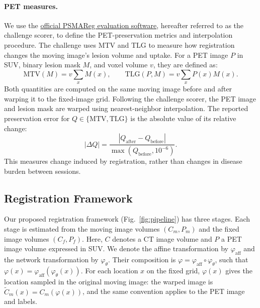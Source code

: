 \paragraph{PET measures.}
We use the \href{https://github.com/JHU-MedImage-Reg/Learn2Reg26_PSMA/tree/main/psmareg_scoring_program}{official PSMAReg evaluation software}, hereafter referred to as the challenge scorer, to define the PET-preservation metrics and interpolation procedure.
The challenge uses MTV and TLG to measure how registration changes the moving image's lesion volume and uptake.
For a PET image $P$ in SUV, binary lesion mask $M$, and voxel volume $v$, they are defined as:
\begin{equation}
  \mathrm{MTV}(M) = v\sum_x M(x), \qquad
  \mathrm{TLG}(P,M) = v\sum_x P(x)M(x).
  \label{eq:pet_measures}
\end{equation}
Both quantities are computed on the same moving image before and after warping it to the fixed-image grid.
Following the challenge scorer, the PET image and lesion mask are warped using nearest-neighbor interpolation.
The reported preservation error for $Q\in\{\mathrm{MTV},\mathrm{TLG}\}$ is the absolute value of its relative change:
\begin{equation}
  |\Delta Q| = \frac{|Q_{\mathrm{after}} - Q_{\mathrm{before}}|}{\max(Q_{\mathrm{before}},10^{-6})}.
  \label{eq:pet_error}
\end{equation}
This measures change induced by registration, rather than changes in disease burden between sessions.

\subsection{Registration Framework}
\label{sect:pipeline}

Our proposed registration framework (Fig.~\ref{fig:pipeline}) has three stages.
Each stage is estimated from the moving image volumes $(C_m, P_m)$ and the fixed image volumes $(C_f, P_f)$.
Here, $C$ denotes a CT image volume and $P$ a PET image volume expressed in SUV.
We denote the affine transformation by $\varphi_{\mathrm{aff}}$ and the network transformation by $\varphi_\theta$.
Their composition is $\varphi=\varphi_{\mathrm{aff}}\circ\varphi_\theta$, such that $\varphi(x)=\varphi_{\mathrm{aff}}(\varphi_\theta(x))$.
For each location $x$ on the fixed grid, $\varphi(x)$ gives the location sampled in the original moving image: the warped image is $\widetilde C_m(x)=C_m(\varphi(x))$, and the same convention applies to the PET image and labels.

